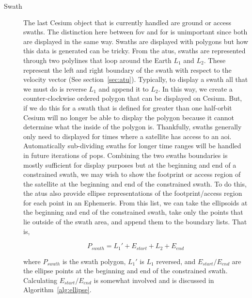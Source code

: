 \begin{description}
    \item[Swath] The last Cesium object that is currently handled are ground or
	access swaths. The distinction here between \gls{fov} and \gls{for} is
	unimportant since both are displayed in the same way. Swaths are
	displayed with polygons but how this data is generated can be tricky.
	From the \glspl{atu}, swaths are represented through two polylines that
	loop around the Earth $L_1$ and $L_2$. These represent the left and
	right boundary of the swath with respect to the velocity vector (See
	section~\ref{sec:atu}).  Typically, to display a swath all that we must
	do is reverse $L_1$ and append it to $L_2$. In this way, we create a
	counter-clockwise ordered polygon that can be displayed on Cesium.
	But, if we do this for a swath that is defined for greater than one
	half-orbit Cesium will no longer be able to display the polygon because
	it cannot determine what the inside of the polygon is. Thankfully,
	swaths generally only need to displayed for times where a satellite has
	access to an \gls{aoi}. Automatically sub-dividing swaths for longer
	time ranges will be handled in future iterations of \gls{pops}.
	Combining the two swaths boundaries is mostly sufficient for display
	purposes but at the beginning and end of a constrained swath, we may
	wish to show the footprint or access region of the satellite at the
	beginning and end of the constrained swath. To do this, the \glspl{atu}
	also provide ellipse representations of the footprint/access region for
	each point in an Ephemeris.  From this list, we can take the ellipsoids
	at the beginning and end of the constrained swath, take only the points
	that lie outside of the swath area, and append them to the boundary
	lists.  That is, 

	\begin{equation*} 
	    P_{swath} = L_1' + E_{start} + L_2 + E_{end} 
	\end{equation*} 

	where $P_{swath}$ is the swath polygon, $L_1'$
	is $L_1$ reversed, and $E_{start}/E_{end}$ are the ellipse points at
	the beginning and end of the constrained swath.  Calculating
	$E_{start}/E_{end}$ is somewhat involved and is discussed in
	Algorithm~\ref{alg:ellipse}.
	

\end{description}
